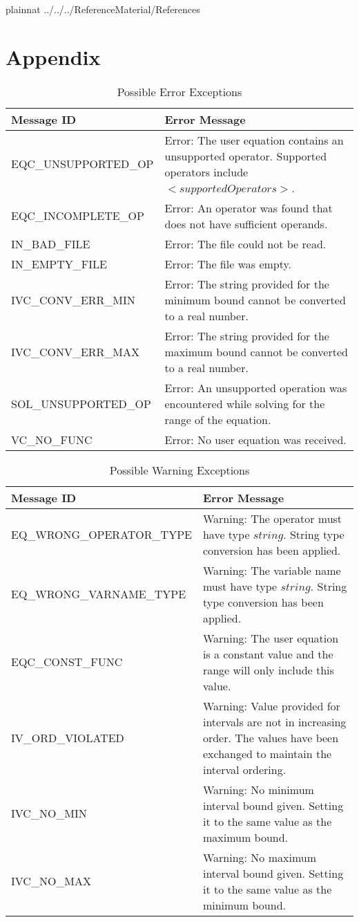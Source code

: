 \documentclass[12pt, titlepage]{article}
\begin{document}
\newpage

 {plainnat}
 {../../../ReferenceMaterial/References}

\newpage

\section{Appendix} \label{Appendix}

\renewcommand{\arraystretch}{1.2}

\begin{longtable}{l p{9.5cm}}
	\caption{Possible Error Exceptions} \\
	\toprule
	\textbf{Message ID} & \textbf{Error Message} \\
	\midrule
	EQC\_UNSUPPORTED\_OP & Error: The user equation contains an unsupported 
	operator. Supported operators include $<supportedOperators>$.\\
	EQC\_INCOMPLETE\_OP & Error: An operator was found that does not have 
	sufficient operands. \\
	IN\_BAD\_FILE & Error: The file could not be read. \\
	IN\_EMPTY\_FILE & Error: The file was empty. \\
	IVC\_CONV\_ERR\_MIN & Error: The string provided for the minimum bound 
	cannot be converted to a real number. \\
	IVC\_CONV\_ERR\_MAX & Error: The string provided for the maximum bound 
	cannot be converted to a real number.\\
	SOL\_UNSUPPORTED\_OP & Error: An unsupported operation was encountered 
	while solving for the range of the equation.\\
	VC\_NO\_FUNC & Error: No user equation was received. \\
	\bottomrule
\end{longtable}

\begin{longtable}{l p{9.5cm}}
	\caption{Possible Warning Exceptions} \\
	\toprule
	\textbf{Message ID} & \textbf{Error Message} \\
	\midrule
	EQ\_WRONG\_OPERATOR\_TYPE & Warning: The operator must have type $string$. 
	String type conversion has been applied.\\
	EQ\_WRONG\_VARNAME\_TYPE & Warning: The variable name must have type 
	$string$. String type conversion has been applied. \\
	EQC\_CONST\_FUNC & Warning: The user equation is a constant value and the 
	range will only include this value.\\
	IV\_ORD\_VIOLATED & Warning: Value provided for intervals are not in 
	increasing order. The values have been exchanged to maintain the interval 
	ordering. \\
	IVC\_NO\_MIN & Warning: No minimum interval bound given. Setting it to the 
	same value as the maximum bound. \\
	IVC\_NO\_MAX & Warning: No maximum interval bound given. Setting it to the 
	same value as the minimum bound. \\
	\bottomrule
\end{longtable}
\end{document}
